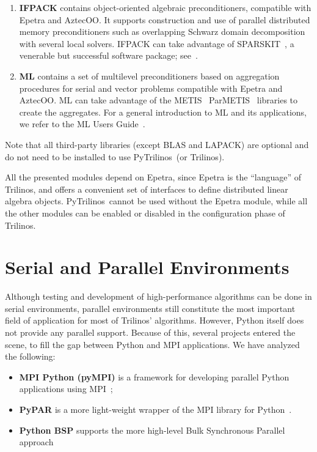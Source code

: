 \documentclass[acmtocl]{acmtrans2m}
\newcommand{\PyTrilinos}{{PyTrilinos}}
\begin{document}
\begin{enumerate}
\item {\bf IFPACK} contains object-oriented algebraic preconditioners,
  compatible with Epetra and AztecOO.  It supports construction and
  use of parallel distributed memory preconditioners such as
  overlapping Schwarz domain decomposition with several local solvers.
  IFPACK can take advantage of SPARSKIT~\cite{sparskit}, a venerable
  but successful software package; see~\cite{ifpack-guide}.

\item {\bf ML} contains a set of multilevel preconditioners based on
  aggregation procedures for serial and vector problems compatible with Epetra
  and AztecOO. ML can take
  advantage of the METIS~\cite{metis} ParMETIS~\cite{parmetis}
  libraries to create the aggregates.  For a general introduction to
  ML and its applications, we refer to the ML Users
  Guide~\cite{ml-guide}.

\end{enumerate}

Note that all third-party libraries (except BLAS and LAPACK) are
optional and do not need to be installed to use \PyTrilinos\ (or
Trilinos).

All the presented modules depend on Epetra, since Epetra is the ``language''
of Trilinos, and offers a convenient set of interfaces to define distributed
linear algebra objects.  \PyTrilinos\ cannot be used without the Epetra
module, while all the other modules can be enabled or disabled in the
configuration phase of Trilinos.

\section{Serial and Parallel Environments}
\label{sec:serial}

Although testing and development of high-performance algorithms can be done in
serial environments, parallel environments still constitute the most
important field of application for most of Trilinos' algorithms. However,
  Python itself does not provide any parallel support. Because of this,
  several projects entered the scene, to fill the gap between Python and
  MPI applications. We have analyzed the following:
\begin{itemize}
\item {\bf MPI Python (pyMPI)} is a framework for developing parallel Python
  applications using MPI~\cite{MPI-Python};
\item {\bf PyPAR} is a more light-weight wrapper of the MPI library
  for Python~\cite{pypar}.
\item {\bf Python BSP} supports the more high-level Bulk Synchronous
  Parallel approach~\cite{bsp}
\end{itemize}
\end{document}
